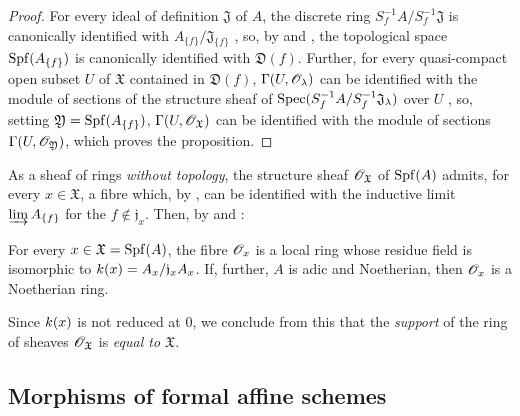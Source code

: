 \begin{proof}
For every ideal of definition $\mathfrak{J}$ of $A$, the discrete ring $S_f^{-1}A/ S_f^{-1}\mathfrak{J}$ is canonically identified with $A_{\{f\}}/\mathfrak{J}_{\{f\}}$ , so, by  and , the topological space $\operatorname{Spf}(A_{\{f\}})$ is canonically identified with $\mathfrak{D}(f)$.
Further, for every quasi-compact open subset $U$ of $\mathfrak{X}$ contained in $\mathfrak{D}(f)$, $\Gamma(U,\mathscr{O}_\lambda)$ can be identified with the module of sections of the structure sheaf of $\operatorname{Spec}(S_f^{-1}A/ S_f^{-1}\mathfrak{J}_\lambda)$ over $U$ , so, setting $\mathfrak{Y}=\operatorname{Spf}(A_{\{f\}})$, $\Gamma(U,\mathscr{O}_\mathfrak{X})$ can be identified with the module of sections $\Gamma(U,\mathscr{O}_\mathfrak{Y})$, which proves the proposition.
\end{proof}

\begin{env}[10.1.5]
\label{I.10.1.5}
As a sheaf of rings \emph{without topology}, the structure sheaf $\mathscr{O}_\mathfrak{X}$ of $\operatorname{Spf}(A)$ admits, for every $x\in\mathfrak{X}$, a fibre which, by , can be identified with the inductive limit $\varinjlim A_{\{f\}}$ for the $f\not\in\mathfrak{j}_x$.
Then, by  and :
\end{env}

\begin{proposition}[10.1.6]
\label{I.10.1.6}
For every $x\in\mathfrak{X}=\operatorname{Spf}(A)$, the fibre $\mathscr{O}_x$ is a local ring whose residue field is isomorphic to $k(x)=A_x/\mathfrak{j}_xA_x$.
If, further, $A$ is adic and Noetherian, then $\mathscr{O}_x$ is a Noetherian ring.
\end{proposition}

Since $k(x)$ is not reduced at $0$, we conclude from this that the \emph{support} of the ring of sheaves $\mathscr{O}_\mathfrak{X}$ is \emph{equal to $\mathfrak{X}$}.

\subsection{Morphisms of formal affine schemes}
\label{subsection:I.10.2}

